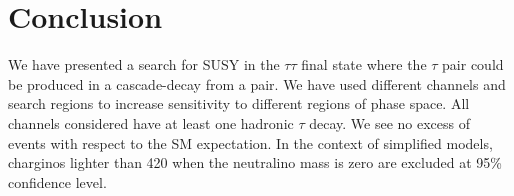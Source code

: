 \section{Conclusion}
\label{sect:conclusion}
We have presented a search for SUSY in the $\tau\tau$ final state where the
$\tau$ pair could be produced in a cascade-decay from a \PSGcpDo pair.
We have used different channels and search regions to increase sensitivity to
different regions of phase space. 
All channels considered have at least one hadronic $\tau$ decay.
We see no excess of events with respect to the SM expectation.
In the context of simplified models, charginos lighter than 420 \GeV when the neutralino mass is zero
are excluded at 95\% confidence level.

